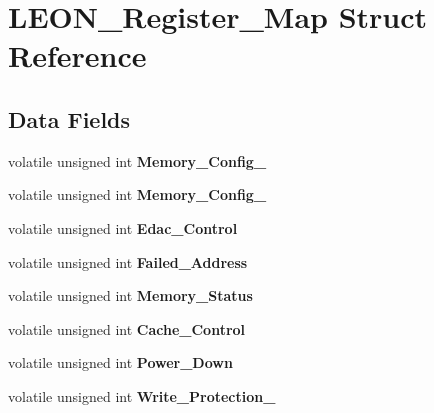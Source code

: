 \hypertarget{structLEON__Register__Map}{}\section{L\+E\+O\+N\+\_\+\+Register\+\_\+\+Map Struct Reference}
\label{structLEON__Register__Map}
\subsection*{Data Fields}
\begin{DoxyCompactItemize}
\item 
\mbox{\label{structLEON__Register__Map_a30282acaae5bf385d4243c548fb37c82}} 
volatile unsigned int {\bfseries Memory\+\_\+\+Config\+\_}
\item 
\mbox{\label{structLEON__Register__Map_a7032e5a694fee58bf17913f55fd5f336}} 
volatile unsigned int {\bfseries Memory\+\_\+\+Config\+\_}
\item 
\mbox{\label{structLEON__Register__Map_abb0086571e69d7592845de920987a87c}} 
volatile unsigned int {\bfseries Edac\+\_\+\+Control}
\item 
\mbox{\label{structLEON__Register__Map_a22795fa879fefa39229ea8cbe6f206f4}} 
volatile unsigned int {\bfseries Failed\+\_\+\+Address}
\item 
\mbox{\label{structLEON__Register__Map_aff88a4ac8955fa5541a05749ece9cbd7}} 
volatile unsigned int {\bfseries Memory\+\_\+\+Status}
\item 
\mbox{\label{structLEON__Register__Map_a616a15d9747eb0ab671a0b3dc21a5412}} 
volatile unsigned int {\bfseries Cache\+\_\+\+Control}
\item 
\mbox{\label{structLEON__Register__Map_a597ec2ee3c58b06917a8b4c29461bfc8}} 
volatile unsigned int {\bfseries Power\+\_\+\+Down}
\item 
\mbox{\label{structLEON__Register__Map_a60baa61c3d0dd3e38956405f277fa706}} 
volatile unsigned int {\bfseries Write\+\_\+\+Protection\+\_}

\end{DoxyCompactItemize}
